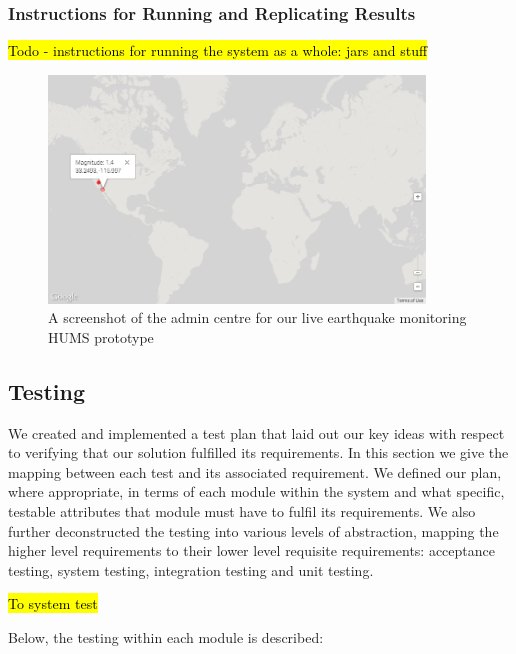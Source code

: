 \documentclass[10pt,a4paper]{article}
\begin{document}
\subsubsection{Instructions for Running and Replicating Results}
\hl{Todo - instructions for running the system as a whole: jars and stuff}

\begin{figure}[htbp!]
  \centering
  \includegraphics[width=10cm]{images/plotearthquakes.png}
  \caption{A screenshot of the admin centre for our live earthquake monitoring HUMS prototype}
  \label{fig:plotearthquakes}
\end{figure}

\subsection{Testing} 
We created and implemented a test plan that laid out our key ideas
with respect to verifying that our solution fulfilled its
requirements. In this section we give the mapping between each
test and its associated requirement. We
defined our plan, where appropriate, in terms of each module within
the system and what specific, testable attributes that module must
have to fulfil its requirements. We also further deconstructed the
testing into various levels of abstraction, mapping the higher level
requirements to their lower level requisite requirements: acceptance
testing, system testing, integration testing and unit
testing.


\hl{To system test}

Below, the testing within each module is described:
\end{document}
